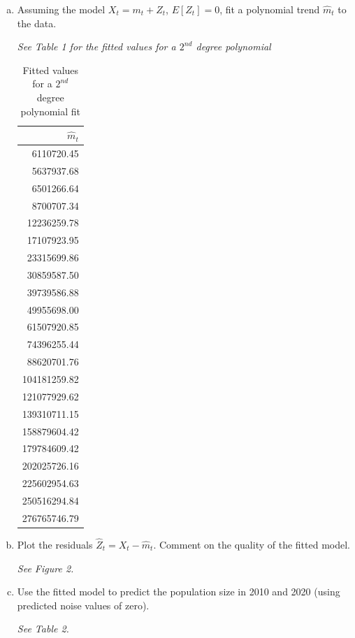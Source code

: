 \documentclass[a4paper, 11pt]{article}
\begin{document}
\begin{itemize}
\begin{enumerate}[(a)]
		\item Assuming the model $X_t = m_t + Z_t$, $E[Z_t] = 0$, fit a polynomial trend $\widehat{m}_t$ to the data. \newline 
		
		\emph{See Table 1 for the fitted values for a $2^{nd}$ degree polynomial}
		
\begin{table}[h!]
\small
\centering
\begin{tabular}{r}
  \hline
	$\widehat{m}_t$\\ 
  \hline
	6110720.45 \\ 
  5637937.68 \\ 
  6501266.64 \\ 
  8700707.34 \\ 
  12236259.78 \\ 
  17107923.95 \\ 
  23315699.86 \\ 
  30859587.50 \\ 
  39739586.88 \\ 
  49955698.00 \\ 
  61507920.85 \\ 
  74396255.44 \\ 
  88620701.76 \\ 
  104181259.82 \\ 
  121077929.62 \\ 
  139310711.15 \\ 
  158879604.42 \\ 
  179784609.42 \\ 
  202025726.16 \\ 
  225602954.63 \\ 
  250516294.84 \\ 
  276765746.79 \\ 
   \hline
\end{tabular}
\caption{Fitted values for a $2^{nd}$ degree polynomial fit}
\end{table}

		\item Plot the residuals $\hat{Z}_t = X_t - \hat{m}_t$. Comment on the quality of the fitted model. \newline 

		\emph{See Figure 2.}
		\item Use the fitted model to predict the population size in 2010 and 2020 (using predicted noise values of zero). \newline 
		
		\emph{See Table 2.}
		

\end{enumerate}
\end{itemize}
\end{document}
